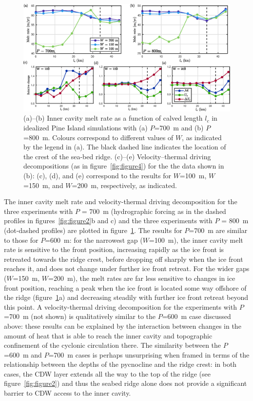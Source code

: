 \documentclass[draft]{agujournal2019}
\begin{document}
\begin{figure}
    \centering
    \includegraphics[width = \textwidth]{../make_figures/plots/figure8.eps}
    \caption{(a)--(b) Inner cavity melt rate as a function of calved length $l_c$ in idealized Pine Island simulations with (a) $P$=700~m and (b) $P$=800~m. Colours correspond to different values of $W$, as indicated by the legend in (a). The black dashed line indicates the location of the crest of the sea-bed ridge. (c)--(e) Velocity--thermal driving decompositions (as in figure~\ref{fig:figure4}) for the the data shown in (b): (c), (d), and (e) correspond to the results for $W$=100~m, $W$=150~m, and $W$=200~m, respectively, as indicated.}
    \label{fig:figure8}
\end{figure}


The inner cavity melt rate and velocity-thermal driving decomposition for the three experiments with $P$ = 700~m (hydrographic forcing as in the dashed profiles in figures~\ref{fig:figure2}b and c) and the three experiments with $P$ = 800~m (dot-dashed profiles) are plotted in figure~\ref{fig:figure8}. The results for $P$=700~m are similar to those for $P$=600~m: for the narrowest gap ($W$=100~m), the inner cavity melt rate is sensitive to the front position, increasing rapidly as the ice front is retreated towards the ridge crest, before dropping off sharply when the ice front reaches it, and does not change under further ice front retreat. For the wider gaps ($W$=150~m, $W$=200~m), the melt rates are far less sensitive to changes in ice front position, reaching a peak when the ice front is located some way offshore of the ridge (figure~\ref{fig:figure8}a) and decreasing steadily with further ice front retreat beyond this point. A velocity-thermal driving decomposition for the experiments with $P$=700~m (not shown) is qualitatively similar to the $P$=600~m case discussed above:  these results can be explained by the interaction between changes in the amount of heat that is able to reach the inner cavity and topographic confinement of the cyclonic circulation there. The similarity between the $P$=600~m and $P$=700~m cases is perhaps unsurprising when framed in terms of the relationship between the depths of the pycnocline and the ridge crest: in both cases, the CDW layer extends all the way to the top of the ridge (see figure~\ref{fig:figure2}) and thus the seabed ridge alone does not provide a significant barrier to CDW access to the inner cavity.
\end{document}
